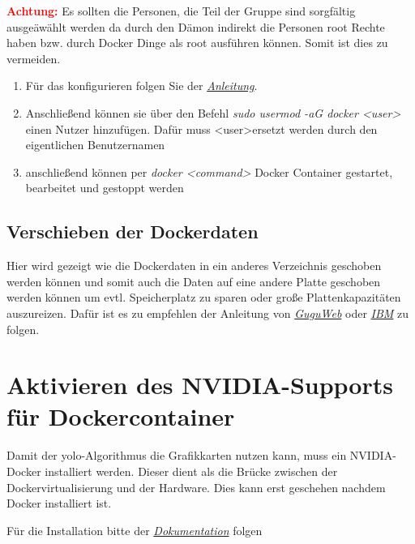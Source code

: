 \textcolor{red}{\textbf{Achtung:}} Es sollten die Personen, die Teil der Gruppe sind sorgfältig ausgeäwählt werden da durch den Dämon indirekt die Personen root Rechte haben bzw. durch Docker Dinge als root ausführen können. Somit ist dies zu vermeiden. 

\begin{enumerate}
    \item Für das konfigurieren folgen Sie der \textit{\href{https://docs.docker.com/engine/install/linux-postinstall/}{Anleitung}}. 
    \item Anschließend können sie über den Befehl \textit{ sudo usermod -aG docker \textless user\textgreater} einen Nutzer hinzufügen. Dafür muss \textless user\textgreater ersetzt werden durch den eigentlichen Benutzernamen
    \item anschließend können per \textit{docker \textless command\textgreater} Docker Container gestartet, bearbeitet und gestoppt werden
\end{enumerate}

\subsection{Verschieben der Dockerdaten}
Hier wird gezeigt wie die Dockerdaten in ein anderes Verzeichnis geschoben werden können und somit auch die Daten auf eine andere Platte geschoben werden können um evtl. Speicherplatz zu sparen oder große Plattenkapazitäten auszureizen. Dafür ist es zu empfehlen der Anleitung von \textit{\href{https://www.guguweb.com/2019/02/07/how-to-move-docker-data-directory-to-another-location-on-ubuntu/}{GuguWeb}} oder \textit{\href{https://www.ibm.com/docs/en/z-logdata-analytics/5.1.0?topic=compose-relocating-docker-root-directory}{IBM}} zu folgen.

\section{Aktivieren des NVIDIA-Supports für Dockercontainer}
Damit der \ac{yolo}-Algorithmus die Grafikkarten nutzen kann, muss ein NVIDIA-Docker installiert werden. Dieser dient als die Brücke zwischen der Dockervirtualisierung und der Hardware. Dies kann erst geschehen nachdem Docker installiert ist.

Für die Installation bitte der \textit{\href{https://docs.nvidia.com/datacenter/cloud-native/container-toolkit/install-guide.html}{Dokumentation}} folgen